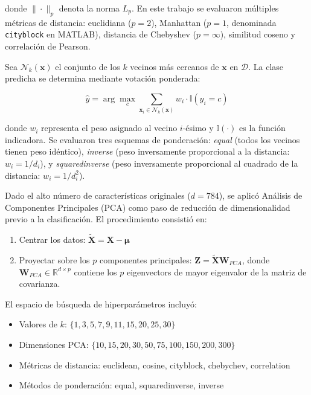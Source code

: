 \documentclass[11pt, a4paper]{article}
\begin{document}
 donde $\|\cdot\|_p$ denota la norma $L_p$. En este trabajo se evaluaron múltiples métricas de distancia: euclidiana ($p=2$), Manhattan ($p=1$, denominada \texttt{cityblock} en MATLAB), distancia de Chebyshev ($p=\infty$), similitud coseno y correlación de Pearson.

Sea $\mathcal{N}_k(\mathbf{x})$ el conjunto de los $k$ vecinos más cercanos de $\mathbf{x}$ en $\mathcal{D}$. La clase predicha se determina mediante votación ponderada:

\begin{equation}
\hat{y} = \arg\max_{c} \sum_{\mathbf{x}_i \in \mathcal{N}_k(\mathbf{x})} w_i \cdot \mathbb{I}(y_i = c)
\end{equation}

 donde $w_i$ representa el peso asignado al vecino $i$-ésimo y $\mathbb{I}(\cdot)$ es la función indicadora. Se evaluaron tres esquemas de ponderación: \textit{equal} (todos los vecinos tienen peso idéntico), \textit{inverse} (peso inversamente proporcional a la distancia: $w_i = 1/d_i$), y \textit{squaredinverse} (peso inversamente proporcional al cuadrado de la distancia: $w_i = 1/d_i^2$).

Dado el alto número de características originales ($d=784$), se aplicó Análisis de Componentes Principales (PCA) como paso de reducción de dimensionalidad previo a la clasificación. El procedimiento consistió en:

\begin{enumerate}
    \item Centrar los datos: $\tilde{\mathbf{X}} = \mathbf{X} - \boldsymbol{\mu}$
    \item Proyectar sobre los $p$ componentes principales: $\mathbf{Z} = \tilde{\mathbf{X}}\mathbf{W}_{PCA}$, donde $\mathbf{W}_{PCA} \in \mathbb{R}^{d \times p}$ contiene los $p$ eigenvectors de mayor eigenvalor de la matriz de covarianza.
\end{enumerate}

El espacio de búsqueda de hiperparámetros incluyó:
\begin{itemize}
    \item Valores de $k$: $\{1, 3, 5, 7, 9, 11, 15, 20, 25, 30\}$
    \item Dimensiones PCA: $\{10, 15, 20, 30, 50, 75, 100, 150, 200, 300\}$
    \item Métricas de distancia: euclidean, cosine, cityblock, chebychev, correlation
    \item Métodos de ponderación: equal, squaredinverse, inverse
\end{itemize}
\end{document}
